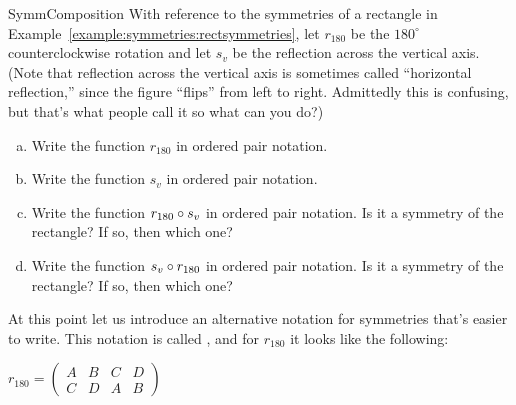 
\begin{exercise}{SymmComposition}
With reference to the symmetries of a rectangle in Example~\ref{example:symmetries:rectsymmetries}, let  $r_{180}$ be the $180^\circ$ counterclockwise rotation and let $s_v$ be the reflection across the vertical axis.
(Note that reflection across the vertical axis is sometimes called ``horizontal reflection,'' since the figure ``flips'' from left to right. Admittedly this is confusing, but that's what people call it so what can you do?)
\begin{enumerate}[(a)]
\item
Write the function $r_{180}$ in ordered pair notation.
\item
Write the function $s_v$ in ordered pair notation.
\item
Write the function $r_{180} \circ s_v$ in ordered pair notation. Is it a symmetry of the rectangle? If so, then which one?
\item
Write the function $s_v \circ r_{180}$ in ordered pair notation. Is it a symmetry of the rectangle? If so, then which one?
\end{enumerate}
\end{exercise}
 
At this point let us introduce an alternative notation for symmetries that's easier to write.  This notation is called , and for $r_{180}$ it looks like the following:
\medskip

$r_{180} = \begin{pmatrix} A & B & C & D \\ C & D & A & B \end{pmatrix} $
\medskip

